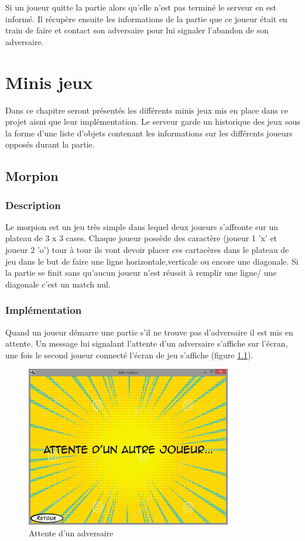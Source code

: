 \documentclass{report}
\begin{document}
Si un joueur quitte la partie alors qu'elle n'est pas terminé le serveur en est informé. Il récupère ensuite les informations de la partie que
ce joueur était en train de faire et contact son adversaire pour lui signaler l'abandon de son adversaire.

\chapter{Minis jeux}
Dans ce chapitre seront présentés les différents minis jeux mis en place dans
ce projet aisni que leur implémentation.
Le serveur garde un historique des jeux sous la forme d'une liste d'objets
contenant les informations sur les différents joueurs opposés durant la partie.

\section{Morpion}
\label{Morpion}

\subsection{Description}
Le morpion est un jeu très simple dans lequel deux joueurs s'affronte sur un plateau de 3 x 3 cases. Chaque joueur possède des caractère (joueur 1 'x' et joueur 2 'o')
tour à tour ils vont devoir placer ces cartacères dans le plateau de jeu dans le but de faire une ligne horizontale,verticale ou encore une diagonale.
Si la partie se finit sans qu'aucun joueur n'est réussit à remplir une ligne/ une diagonale c'est un match nul.
\subsection{Implémentation}

Quand un joueur démarre une partie s'il ne trouve pas d'adversaire il est mis en attente. Un message lui signalant l'attente d'un
adversaire s'affiche sur l'écran, une fois le second joueur connecté l'écran de jeu s'affiche (figure \ref{attente_adversaire}).

\begin{figure}[H]
	\centering\includegraphics[width=9cm]{morpionwaiting}
	\caption{Attente d'un adversaire}
  \label{attente_adversaire}
\end{figure}
\end{document}
